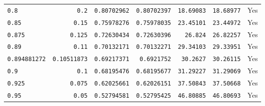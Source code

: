 \begin{longtable}{lrrrrrr}
\texttt{0.8} & \texttt{0.2} & \texttt{0.80702962} & \texttt{0.80702397} & \texttt{18.69083} & \texttt{18.68977} & Yes \\
\texttt{0.85} & \texttt{0.15} & \texttt{0.75978276} & \texttt{0.75978035} & \texttt{23.45101} & \texttt{23.44972} & Yes \\
\texttt{0.875} & \texttt{0.125} & \texttt{0.72630434} & \texttt{0.72630396} & \texttt{26.824} & \texttt{26.82257} & Yes \\
\texttt{0.89} & \texttt{0.11} & \texttt{0.70132171} & \texttt{0.70132271} & \texttt{29.34103} & \texttt{29.33951} & Yes \\
\texttt{0.894881272} & \texttt{0.10511873} & \texttt{0.69217371} & \texttt{0.6921752} & \texttt{30.2627} & \texttt{30.26115} & Yes \\
\texttt{0.9} & \texttt{0.1} & \texttt{0.68195476} & \texttt{0.68195677} & \texttt{31.29227} & \texttt{31.29069} & Yes \\
\texttt{0.925} & \texttt{0.075} & \texttt{0.62025661} & \texttt{0.62026151} & \texttt{37.50843} & \texttt{37.50668} & Yes \\
\texttt{0.95} & \texttt{0.05} & \texttt{0.52794581} & \texttt{0.52795425} & \texttt{46.80885} & \texttt{46.80693} & Yes \\
\end{longtable}
\endgroup


